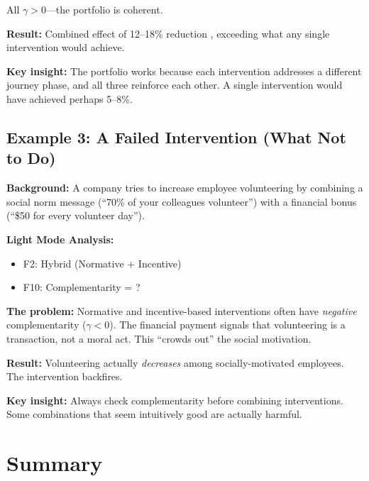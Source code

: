 All $\gamma > 0$---the portfolio is coherent.

\textbf{Result:} Combined effect of 12--18\% reduction \citep{allcott2011}, exceeding what any single intervention would achieve.

\textbf{Key insight:} The portfolio works because each intervention addresses a different journey phase, and all three reinforce each other. A single intervention would have achieved perhaps 5--8\%.

\subsection{Example 3: A Failed Intervention (What Not to Do)}

\textbf{Background:} A company tries to increase employee volunteering by combining a social norm message (``70\% of your colleagues volunteer'') with a financial bonus (``\$50 for every volunteer day'').

\textbf{Light Mode Analysis:}
\begin{itemize}
\item F2: Hybrid (Normative + Incentive)
\item F10: Complementarity = ?
\end{itemize}

\textbf{The problem:} Normative and incentive-based interventions often have \textit{negative} complementarity ($\gamma < 0$). The financial payment signals that volunteering is a transaction, not a moral act. This ``crowds out'' the social motivation.

\textbf{Result:} Volunteering actually \textit{decreases} among socially-motivated employees. The intervention backfires.

\textbf{Key insight:} Always check complementarity before combining interventions. Some combinations that seem intuitively good are actually harmful.


\section{Summary}
\label{sec:17-summary}


